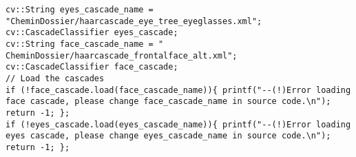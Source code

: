 \begin{lstlisting}
cv::String eyes_cascade_name = "CheminDossier/haarcascade_eye_tree_eyeglasses.xml";
cv::CascadeClassifier eyes_cascade;
cv::String face_cascade_name = " CheminDossier/haarcascade_frontalface_alt.xml";
cv::CascadeClassifier face_cascade;
// Load the cascades
if (!face_cascade.load(face_cascade_name)){ printf("--(!)Error loading face cascade, please change face_cascade_name in source code.\n"); return -1; };
if (!eyes_cascade.load(eyes_cascade_name)){ printf("--(!)Error loading eyes cascade, please change eyes_cascade_name in source code.\n"); return -1; };
\end{lstlisting}
